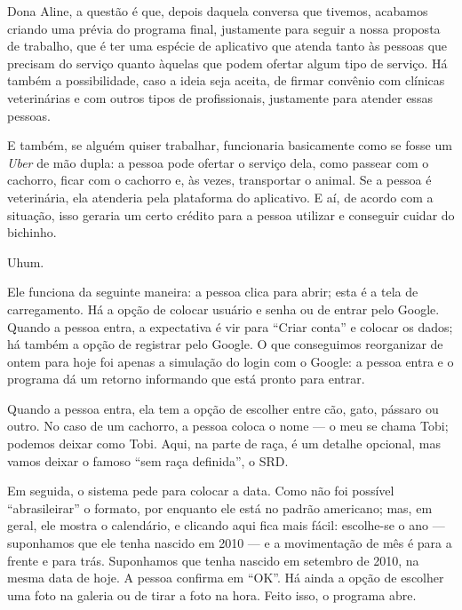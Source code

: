 \documentclass[12pt,a4paper]{article}
\newenvironment{turnos}
  {\begin{list}{}{%
     \setlength{\leftmargin}{2.2cm}%
     \setlength{\labelwidth}{2.0cm}%
     \setlength{\labelsep}{0.2cm}%
     \setlength{\itemsep}{0.6em}%
     \setlength{\parsep}{0pt}}}
  {\end{list}}
\newcommand{\fala}[1]{\item[\textbf{#1}\hfill]}
\begin{document}
\begin{turnos}

\fala{E:} Dona Aline, a questão é que, depois daquela conversa que tivemos, acabamos criando
uma prévia do programa final, justamente para seguir a nossa proposta de trabalho, que é ter
uma espécie de aplicativo que atenda tanto às pessoas que precisam do serviço quanto àquelas
que podem ofertar algum tipo de serviço. Há também a possibilidade, caso a ideia seja aceita,
de firmar convênio com clínicas veterinárias e com outros tipos de profissionais, justamente
para atender essas pessoas.

\fala{E:} E também, se alguém quiser trabalhar, funcionaria basicamente como se fosse um
\textit{Uber} de mão dupla: a pessoa pode ofertar o serviço dela, como passear com o
cachorro, ficar com o cachorro e, às vezes, transportar o animal. Se a pessoa é veterinária,
ela atenderia pela plataforma do aplicativo. E aí, de acordo com a situação, isso geraria um
certo crédito para a pessoa utilizar e conseguir cuidar do bichinho.

\fala{P:} Uhum.

\fala{E:} [Demonstração no aparelho.] Ele funciona da seguinte maneira: a pessoa clica para
abrir; esta é a tela de carregamento. Há a opção de colocar usuário e senha ou de entrar pelo
Google. Quando a pessoa entra, a expectativa é vir para \enquote{Criar conta} e colocar os
dados; há também a opção de registrar pelo Google. O que conseguimos reorganizar de ontem
para hoje foi apenas a simulação do login com o Google: a pessoa entra e o programa dá um
retorno informando que está pronto para entrar.

\fala{E:} Quando a pessoa entra, ela tem a opção de escolher entre cão, gato, pássaro ou
outro. No caso de um cachorro, a pessoa coloca o nome --- o meu se chama Tobi; podemos deixar
como Tobi. Aqui, na parte de raça, é um detalhe opcional, mas vamos deixar o famoso
\enquote{sem raça definida}, o SRD.

\fala{E:} Em seguida, o sistema pede para colocar a data. Como não foi possível
\enquote{abrasileirar} o formato, por enquanto ele está no padrão americano; mas, em geral,
ele mostra o calendário, e clicando aqui fica mais fácil: escolhe-se o ano --- suponhamos que
ele tenha nascido em 2010 --- e a movimentação de mês é para a frente e para trás. Suponhamos
que tenha nascido em setembro de 2010, na mesma data de hoje. A pessoa confirma em
\enquote{OK}. Há ainda a opção de escolher uma foto na galeria ou de tirar a foto na hora.
Feito isso, o programa abre.


\end{turnos}
\end{document}
